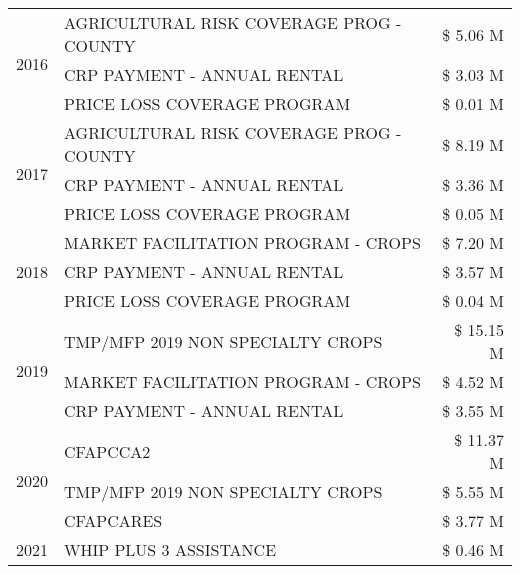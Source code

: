 \begin{tabular}{llr}
\multirow[t]{3}{*}{2016} & AGRICULTURAL RISK COVERAGE PROG - COUNTY & \$ 5.06 M \\
 & CRP PAYMENT - ANNUAL RENTAL & \$ 3.03 M \\
 & PRICE LOSS COVERAGE PROGRAM & \$ 0.01 M \\
\cline{1-3}
\multirow[t]{3}{*}{2017} & AGRICULTURAL RISK COVERAGE PROG - COUNTY & \$ 8.19 M \\
 & CRP PAYMENT - ANNUAL RENTAL & \$ 3.36 M \\
 & PRICE LOSS COVERAGE PROGRAM & \$ 0.05 M \\
\cline{1-3}
\multirow[t]{3}{*}{2018} & MARKET FACILITATION PROGRAM - CROPS & \$ 7.20 M \\
 & CRP PAYMENT - ANNUAL RENTAL & \$ 3.57 M \\
 & PRICE LOSS COVERAGE PROGRAM & \$ 0.04 M \\
\cline{1-3}
\multirow[t]{3}{*}{2019} & TMP/MFP 2019 NON SPECIALTY CROPS & \$ 15.15 M \\
 & MARKET FACILITATION PROGRAM - CROPS & \$ 4.52 M \\
 & CRP PAYMENT - ANNUAL RENTAL & \$ 3.55 M \\
\cline{1-3}
\multirow[t]{3}{*}{2020} & CFAPCCA2 & \$ 11.37 M \\
 & TMP/MFP 2019 NON SPECIALTY CROPS & \$ 5.55 M \\
 & CFAPCARES & \$ 3.77 M \\
\cline{1-3}
2021 & WHIP PLUS 3 ASSISTANCE & \$ 0.46 M \\
\cline{1-3}
\bottomrule
\end{tabular}
